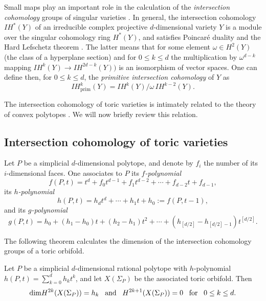  Small maps play an important role in the calculation of the 
 \textit{intersection cohomology} groups of singular varieties \cite{GM}. 
 In general, the intersection cohomology $IH^*(Y)$ of an irreducible complex 
 projective $d$-dimensional variety $Y$ is a module over the singular 
 cohomology ring $H^*(Y)$, and satisfies Poincar\'e duality and the Hard 
 Lefschetz theorem \cite[Theorem 5.4.10]{BBD}. The latter means that for some 
 element $\omega\in H^2(Y)$ (the class of a hyperplane section) and for $0\leq 
 k\leq d$ the multiplication by $\omega^{d-k}$ mapping $IH^k(Y) \to 
 IH^{2d-k}(Y))$  is an isomorphism of vector spaces. One can define then,  for 
 $0\leq 
 k\leq d$,  the \textit{primitive intersection cohomology} of $Y$ 
 as $$IH_{\mathrm{prim}}^k(Y) =  IH^{k}(Y)/ \omega\, IH^{k-2}(Y).$$

The intersection cohomology of toric varieties is intimately related to the 
theory 
of convex polytopes \cite{dCMdec, Stanley}. We will now briefly review this relation. 


 

 
\subsection{Intersection cohomology of toric varieties}
Let $P$ be a simplicial $d$-dimensional polytope, and denote by $f_i$ the 
number of its $i$-dimensional faces. One associates to $ P $ its 
\textit{$f$-polynomial} 
$$f(P,t) = t^d + f_0t^{d-1}+f_1t^{d-2}+ \cdots +f_{d-2}t + f_{d-1},$$  its 
\textit{$h$-polynomial} 
\begin{equation}\label{h-poly}
h(P,t) = h_dt^d+ \cdots +h_1t+h_0 := f(P,t-1),
\end{equation}
and its \textit{$g$-polynomial} 
\begin{equation}\label{g-poly} 
	g(P,t) = h_0+(h_1-h_0)t+(h_2-h_1)t^2+ \cdots +(h_{[d/2]}-h_{[d/2]-1})t^{[d/2]}.
\end{equation}

The following theorem calculates the dimension of the intersection cohomology groups of a toric orbifold.
\begin{prop}\cite[\S5.2]{Fulton}\label{Poincareh-poly}
Let $P$ be a simplicial $d$-dimensional rational polytope with $h$-polynomial $h(P, t) = \sum_{k=0}^d 
h_k t^k$, and let $X(\Sigma_P)$ be the associated toric orbifold. Then 
\begin{equation}\label{smoothhpol}
	\mathrm{dim}H^{2k}(X(\Sigma_P)) = h_k  \text{\,\,\, and \,\,\,} 
	H^{2k+1}(X(\Sigma_P)) = 0 \text{\,\,\, for \,\,\,} 0\leq k \leq d. 
\end{equation}
\end{prop}

